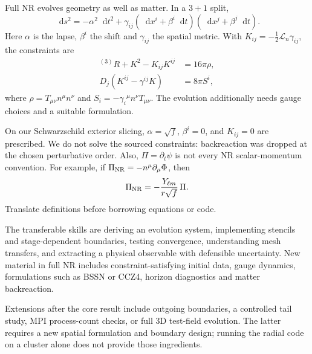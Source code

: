 \documentclass[11pt,a4paper]{article}
\numberwithin{equation}{section}
\newcommand{\dd}{\mathop{}\!\mathrm{d}}
\newcommand{\pd}{\partial}
\begin{document}
Full NR evolves geometry as well as matter. In a $3+1$ split,
\begin{equation}
 \dd s^2=-\alpha^2\dd t^2+
 \gamma_{ij}(\dd x^i+\beta^i\dd t)(\dd x^j+\beta^j\dd t).
\end{equation}
Here $\alpha$ is the lapse, $\beta^i$ the shift and $\gamma_{ij}$ the spatial
metric. With $K_{ij}=-\tfrac12\mathcal L_n\gamma_{ij}$, the constraints are
\begin{align}
 {}^{(3)}R+K^2-K_{ij}K^{ij}&=16\pi\rho,\\
 D_j(K^{ij}-\gamma^{ij}K)&=8\pi S^i,
\end{align}
where $\rho=T_{\mu\nu}n^\mu n^\nu$ and
$S_i=-\gamma_i{}^\mu n^\nu T_{\mu\nu}$.
The evolution additionally needs gauge choices and a suitable formulation.

On our Schwarzschild exterior slicing,
$\alpha=\sqrt f$, $\beta^i=0$, and $K_{ij}=0$ are prescribed.
We do not solve the sourced constraints: backreaction was dropped at the
chosen perturbative order. Also, $\Pi=\pd_t\psi$ is not every NR
scalar-momentum convention. For example, if
$\Pi_{\rm NR}=-n^\mu\pd_\mu\Phi$, then
\begin{equation}
 \Pi_{\rm NR}=-\frac{Y_{\ell m}}{r\sqrt f}\,\Pi .
\end{equation}
Translate definitions before borrowing equations or code.

The transferable skills are deriving an evolution system, implementing
stencils and stage-dependent boundaries, testing convergence, understanding
mesh transfers, and extracting a physical observable with defensible
uncertainty. New material in full NR includes constraint-satisfying initial
data, gauge dynamics, formulations such as BSSN or CCZ4, horizon diagnostics
and matter backreaction.

Extensions after the core result include outgoing boundaries, a controlled
tail study, MPI process-count checks, or full 3D test-field evolution.
The latter requires a new spatial formulation and boundary design; running
the radial code on a cluster alone does not provide those ingredients.

\appendix
\end{document}
